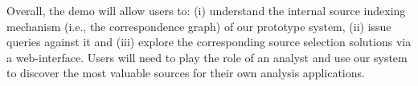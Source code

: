\documentclass{vldb}
\begin{document}
Overall, the demo will allow users to: (i) understand the internal source indexing mechanism (i.e., the correspondence graph) of our prototype system, (ii) issue queries against it and (iii) explore the corresponding source selection solutions via a web-interface. Users will need to play the role of an analyst and use our system to discover the most valuable sources for their own analysis applications.

{\small 

}
\end{document}
